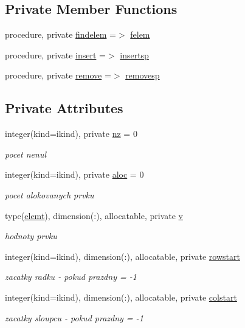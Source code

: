 \subsection*{\-Private \-Member \-Functions}
\begin{DoxyCompactItemize}
\item 
procedure, private \hyperlink{structmtx_1_1smtx_a42927bac81aa7477787679e5f02ac163}{findelem} =$>$ \hyperlink{classmtx_ad87ede6266845e9f227148ef4d2d8fc8}{felem}
\item 
procedure, private \hyperlink{structmtx_1_1smtx_aa5679cefb1f2b55bf371908580d89dcf}{insert} =$>$ \hyperlink{classmtx_acfaae9fe81311d1d0a7c0b57b8db4204}{insertsp}
\item 
procedure, private \hyperlink{structmtx_1_1smtx_a050bacd00a53420fd9eabc8a0ef39b04}{remove} =$>$ \hyperlink{classmtx_a4a9f30e7e4915927e3fb4a9eef74c67c}{removesp}
\end{DoxyCompactItemize}
\subsection*{\-Private \-Attributes}
\begin{DoxyCompactItemize}
\item 
integer(kind=ikind), private \hyperlink{structmtx_1_1smtx_afa772e98ed5d92de7af52fa3fd90ab02}{nz} = 0
\begin{DoxyCompactList}\small\item\em pocet nenul \end{DoxyCompactList}\item 
integer(kind=ikind), private \hyperlink{structmtx_1_1smtx_acea14dde1b53852c39053ef8c417a6fc}{aloc} = 0
\begin{DoxyCompactList}\small\item\em pocet alokovanych prvku \end{DoxyCompactList}\item 
type(\hyperlink{structmtx_1_1elemt}{elemt}), dimension(\-:), \*
allocatable, private \hyperlink{structmtx_1_1smtx_aefb573912d9722d432a04e74fad75ba9}{v}
\begin{DoxyCompactList}\small\item\em hodnoty prvku \end{DoxyCompactList}\item 
integer(kind=ikind), dimension(\-:), \*
allocatable, private \hyperlink{structmtx_1_1smtx_a363f8a38834bc21f7db7a79f171e72d0}{rowstart}
\begin{DoxyCompactList}\small\item\em zacatky radku -\/ pokud prazdny = -\/1 \end{DoxyCompactList}\item 
integer(kind=ikind), dimension(\-:), \*
allocatable, private \hyperlink{structmtx_1_1smtx_af03dd1dc7a8fe0743a84e2cce99563ff}{colstart}
\begin{DoxyCompactList}\small\item\em zacatky sloupcu -\/ pokud prazdny = -\/1 \end{DoxyCompactList}\end{DoxyCompactItemize}


